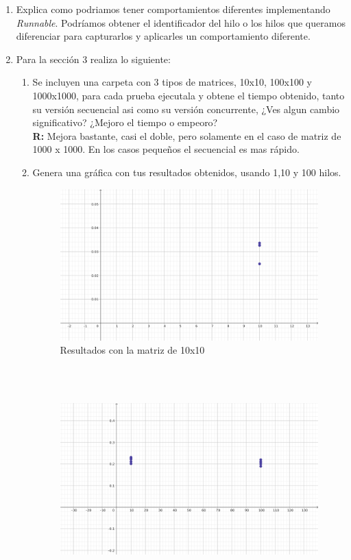 \documentclass[12pt]{extarticle} %
\begin{document}
\begin{enumerate}
    \item Explica como podriamos tener comportamientos diferentes implementando \textit{Runnable}.
    Podríamos obtener el identificador del hilo o los hilos que queramos diferenciar para capturarlos y aplicarles un comportamiento diferente.
    \item Para la sección 3 realiza lo siguiente:
    \begin{enumerate}
        \item Se incluyen una carpeta con 3 tipos de matrices, 10x10, 100x100 y 1000x1000, para cada prueba ejecutala y obtene el tiempo obtenido, tanto su versión secuencial asi como su versión concurrente, ¿Ves algun cambio significativo? ¿Mejoro el tiempo o empeoro? \\
        \textbf{R:} Mejora bastante, casi el doble, pero solamente en el caso de matriz de 1000 x 1000. En los casos pequeños el secuencial es mas rápido.
        \item Genera una gráfica con tus resultados obtenidos, usando 1,10 y 100 hilos.
        \begin{figure}[htbp]
            \centering
        \includegraphics[scale=0.5]{images/M1.png}
        \caption{Resultados con la matriz de 10x10}
        \label{fig:enter-label} 
        \end{figure}
        \\\\
        \begin{figure}[htbp]
            \centering
        \includegraphics[scale=0.5]{images/M100.png}

\end{figure}
\end{enumerate}
\end{enumerate}
\end{document}
